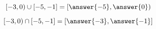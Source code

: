 \documentclass{ximera}
\author{Lee Wayand}
\begin{document}
\begin{exercise}



\begin{question}



\[
[-3, 0) \cup [-5, -1] = \left[ \answer{-5}, \answer{0} \right)
\]

\end{question}




\begin{question}



\[
[-3, 0) \cap [-5, -1] = \left[ \answer{-3}, \answer{-1} \right]
\]

\end{question}









\end{exercise}
\end{document}
